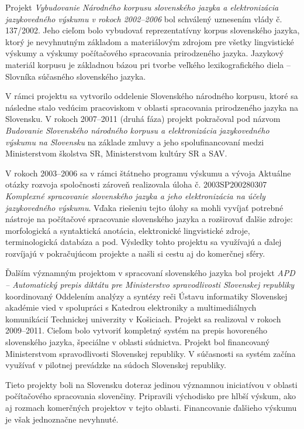 \begin{multicols}{2}
Projekt \emph{Vybudovanie Národného korpusu slovenského jazyka a elektronizácia jazykovedného výskumu v rokoch 2002--2006} bol schválený uznesením vlády č. 137/2002. Jeho cieľom bolo vybudovať reprezentatívny korpus slovenského jazyka, ktorý je nevyhnutným základom a materiálovým zdrojom pre všetky lingvistické výskumy a výskumy počítačového spracovania prirodzeného jazyka. Jazykový materiál korpusu je základnou bázou pri tvorbe veľkého lexikografického diela -- Slovníka súčasného slovenského jazyka. 

V rámci projektu sa vytvorilo oddelenie Slovenského národného korpusu, ktoré sa následne stalo vedúcim pracoviskom v oblasti spracovania prirodzeného jazyka na Slovensku. V rokoch 2007--2011 (druhá fáza) projekt pokračoval pod názvom \emph{Budovanie Slovenského národného korpusu a elektronizácia jazykovedného výskumu na Slovensku} na základe zmluvy a jeho spolufinancovaní medzi Ministerstvom školstva SR, Ministerstvom kultúry SR a SAV.

V rokoch 2003--2006 sa v rámci štátneho programu výskumu a vývoja Aktuálne otázky rozvoja spoločnosti zároveň realizovala úloha č. 2003SP200280307 \emph{Komplexné spracovanie slovenského jazyka a jeho elektronizácia na účely jazykovedného výskumu}. Vďaka riešeniu tejto úlohy sa mohli vyvíjať potrebné nástroje na počítačové spracovanie slovenského jazyka a rozširovať ďalšie zdroje: morfologická a syntaktická anotácia, elektronické lingvistické zdroje, terminologická databáza a pod. Výsledky tohto projektu sa využívajú a ďalej rozvíjajú v pokračujúcom projekte a našli si cestu aj do komerčnej sféry.

Ďalším významným projektom v spracovaní slovenského jazyka bol projekt \emph{APD
--  Automatický prepis diktátu pre Ministerstvo spravodlivosti Slovenskej
republiky} koordinovaný Oddelením analýzy a syntézy reči Ústavu informatiky
Slovenskej akadémie vied v spolupráci s Katedrou elektroniky a multimediálnych
komunikácií Technickej univerzity v Košiciach. Projekt sa realizoval v rokoch
2009--2011. Cieľom bolo vytvoriť kompletný systém na prepis hovoreného
slovenského jazyka, špeciálne v oblasti súdnictva. Projekt bol financovaný
Ministerstvom spravodlivosti Slovenskej republiky. V súčasnosti sa systém začína
využívať v pilotnej prevádzke na súdoch Slovenskej republiky.

Tieto projekty boli na Slovensku doteraz jedinou významnou iniciatívou v oblasti počítačového spracovania slovenčiny. Pripravili východisko pre hlbší výskum, ako aj rozmach komerčných projektov v tejto oblasti. Financovanie ďalšieho výskumu je však jednoznačne nevyhnuté. 



\end{multicols}
